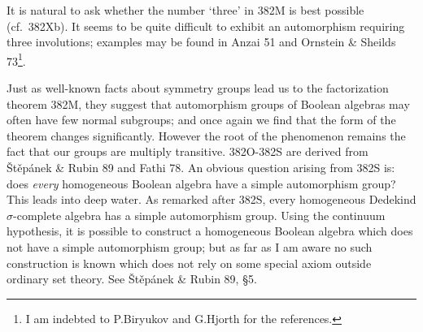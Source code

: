 {It is natural to ask whether the number `three' in 382M is best
possible (cf.\ 382Xb).   It seems to be quite difficult to exhibit an automorphism
requiring three involutions;  examples may be found in {\smc Anzai 51} and {\smc Ornstein \& Sheilds 73}\footnote{I am indebted to P.Biryukov and G.Hjorth for the references.}.

Just as well-known facts about symmetry groups lead us to the
factorization theorem 382M, they suggest that automorphism groups of
Boolean algebras may often have few normal subgroups;  and once again we
find that the form of the theorem changes significantly.   However the
root of the phenomenon remains the fact that our groups are multiply
transitive.
382O-382S are derived from {\smc \v St\v ep\'anek \& Rubin 89} and
{\smc Fathi 78}.   An obvious question arising from 382S is:  does {\it
every} homogeneous
Boolean algebra have a simple automorphism group?    This leads into
deep water.   As remarked after 382S, every homogeneous Dedekind
$\sigma$-complete algebra has a simple automorphism group.   Using the
continuum hypothesis, it is possible to construct a homogeneous Boolean
algebra which does not have a simple automorphism group;  but as far as
I am aware no such construction is known which does not rely on some
special axiom outside ordinary set theory.   See
{\smc \v St\v ep\'anek \& Rubin 89}, \S5.
}%

\discrpage

